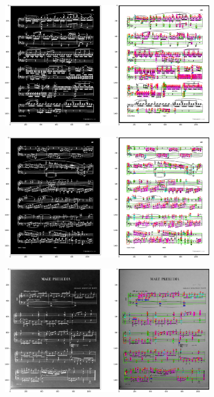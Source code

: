 \documentclass[12pt]{article}
\begin{document}
\begin{enumerate}
\begin{figure}[h!]
\begin{subfigure}[b]{0.48\linewidth}
				\end{subfigure}
				\begin{subfigure}[b]{0.48\linewidth}
					\includegraphics[width=\linewidth]{Medium/Zdj13.png}
				\end{subfigure}
				\begin{subfigure}[b]{0.48\linewidth}
					\includegraphics[width=\linewidth]{Medium/Zdj14.png}
				\end{subfigure}
				\begin{subfigure}[b]{0.48\linewidth}
					\includegraphics[width=\linewidth]{Medium/Zdj15.png}

\end{subfigure}
\end{figure}
\end{enumerate}
\end{document}
